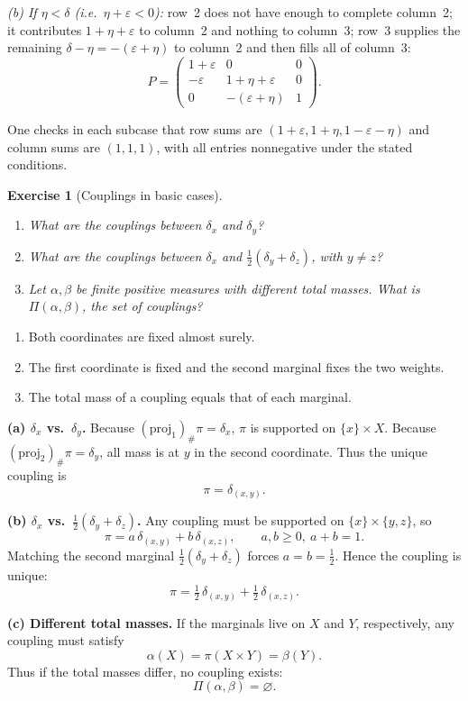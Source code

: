 \documentclass[11pt,a4paper]{article}
\theoremstyle{exostyle}
\newtheorem{exercise}{Exercise}
\begin{document}
\begin{solution}
\hspace{1em}\emph{(b) If $\eta<\delta$ (i.e.\ $\eta+\varepsilon<0$):}
row~2 does not have enough to complete column~2; it contributes $1+\eta+\varepsilon$ to column~2 and nothing to column~3; row~3 supplies the remaining $\delta-\eta=-(\varepsilon+\eta)$ to column~2 and then fills all of column~3:
\[
P=\begin{pmatrix}
1+\varepsilon & 0 & 0\\
-\varepsilon & 1+\eta+\varepsilon & 0\\
0 & -(\varepsilon+\eta) & 1
\end{pmatrix}.
\]

One checks in each subcase that row sums are $(1+\varepsilon,1+\eta,1-\varepsilon-\eta)$ and column sums are $(1,1,1)$, with all entries nonnegative under the stated conditions.
\end{solution}

\begin{exercise}[Couplings in basic cases]\label{ex:simple-couplings}
\begin{enumerate}[label=(\alph*), itemsep=4pt]
\item What are the couplings between $\delta_x$ and $\delta_y$?
\item What are the couplings between $\delta_x$ and $\frac12(\delta_y+\delta_z)$, with $y\neq z$?
\item Let $\alpha,\beta$ be finite \emph{positive} measures with \emph{different} total masses. What is $\Pi(\alpha,\beta)$, the set of couplings?
\end{enumerate}
\end{exercise}
\begin{hints}
\begin{enumerate}[label=(\alph*)]\item Both coordinates are fixed almost surely.\item The first coordinate is fixed and the second marginal fixes the two weights.\item The total mass of a coupling equals that of each marginal.\end{enumerate}
\end{hints}
\begin{solution}
\textbf{(a) $\delta_x$ vs.\ $\delta_y$.}
Because $(\mathrm{proj}_1)_\#\pi=\delta_x$, $\pi$ is supported on $\{x\}\times X$.
Because $(\mathrm{proj}_2)_\#\pi=\delta_y$, all mass is at $y$ in the second coordinate.
Thus the unique coupling is
\[
\pi=\delta_{(x,y)}.
\]

\medskip
\textbf{(b) $\delta_x$ vs.\ $\tfrac12(\delta_y+\delta_z)$.}
Any coupling must be supported on $\{x\}\times\{y,z\}$, so
\[
\pi=a\,\delta_{(x,y)}+b\,\delta_{(x,z)},\qquad a,b\ge0,\ a+b=1.
\]
Matching the second marginal $\tfrac12(\delta_y+\delta_z)$ forces $a=b=\tfrac12$.
Hence the coupling is unique:
\[
\pi=\tfrac12\,\delta_{(x,y)}+\tfrac12\,\delta_{(x,z)}.
\]

\medskip
\textbf{(c) Different total masses.}
If the marginals live on $X$ and $Y$, respectively, any coupling must satisfy
\[
\alpha(X)=\pi(X\times Y)=\beta(Y).
\]
Thus if the total masses differ, no coupling exists:
\[
\Pi(\alpha,\beta)=\varnothing.
\]
\end{solution}
\end{document}
